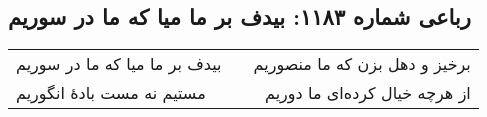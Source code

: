 \begin{center}
\section*{رباعی شماره ۱۱۸۳: بیدف بر ما میا که ما در سوریم}
\label{sec:1183}
\begin{longtable}{l p{0.5cm} r}
بیدف بر ما میا که ما در سوریم
&&
برخیز و دهل بزن که ما منصوریم
\\
مستیم نه مست بادهٔ انگوریم
&&
از هرچه خیال کرده‌ای ما دوریم
\\
\end{longtable}
\end{center}
